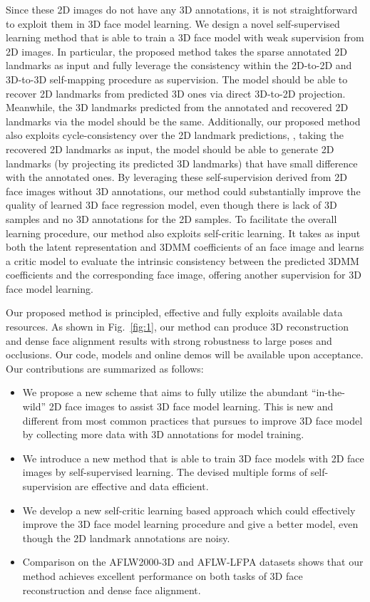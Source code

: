\documentclass[10pt,twocolumn,letterpaper]{article}
\begin{document}
Since these 2D images do not have any 3D annotations, it is not straightforward to exploit them in 3D face model learning. We design a novel self-supervised learning method that is able to train a 3D face model with  weak  supervision from 2D images. In particular, the proposed method  takes  the sparse annotated 2D  landmarks  as input and fully leverage the consistency within the 2D-to-2D and 3D-to-3D self-mapping procedure  as supervision. The model should be able to recover 2D landmarks from predicted 3D ones via direct 3D-to-2D projection. Meanwhile, the 3D landmarks predicted from the annotated  and recovered 2D landmarks via the model should be the same. Additionally, our proposed method also exploits cycle-consistency over the 2D landmark predictions, \ie, taking the recovered 2D landmarks as input, the  model should be able to generate 2D landmarks (by projecting its predicted 3D landmarks)  that have small difference with the annotated ones.
By leveraging  these self-supervision derived from 2D face images without 3D annotations, our method could substantially improve the quality of learned 3D face regression model, even though there is lack of 3D   samples and no 3D annotations for the 2D samples.
To facilitate the overall learning procedure, our method also exploits self-critic learning. It takes as input both the latent representation and 3DMM coefficients of an face image and learns a critic model to evaluate  the intrinsic consistency between the predicted 3DMM coefficients and the corresponding face image, offering another supervision for 3D face model learning.

Our proposed method is principled, effective and fully exploits available data resources. As shown in Fig.~\ref{fig:1},  our method can produce 3D reconstruction and dense face alignment results with strong  robustness to large poses and occlusions. Our code, models and online demos will be available upon acceptance. Our contributions are summarized as follows:
\begin{itemize}
\setlength\itemsep{0em}
\item We propose a new scheme  that aims to  fully utilize the abundant ``in-the-wild'' 2D face images  to assist 3D face model learning. This is new  and different from most common practices that   pursues   to improve  3D face model by collecting   more data with 3D  annotations for model training.
\item We introduce  a new  method that is able to train 3D face models with 2D face images by self-supervised learning. The devised   multiple forms of self-supervision are effective and data efficient. \item We develop a new self-critic   learning based approach which could effectively improve the 3D face model learning procedure and give a better  model, even though the 2D landmark annotations are noisy.
\item Comparison on the AFLW2000-3D and AFLW-LFPA datasets shows that our method achieves excellent performance on both tasks of 3D face reconstruction and dense face alignment.
\end{itemize}
\end{document}
